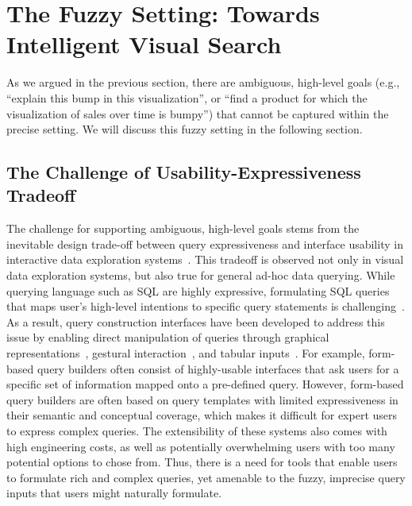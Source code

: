 \section{The Fuzzy Setting: Towards Intelligent Visual Search}\label{sec:vague}
\par As we argued in the previous section, 
there are ambiguous, high-level goals (e.g., 
``explain this bump in this visualization'', or ``find a product
for which the visualization of sales over time is bumpy'') that
cannot be captured within the precise setting. We will discuss this fuzzy setting in the following section. 


\subsection{The Challenge of Usability-Expressiveness Tradeoff}
\par The challenge for supporting ambiguous, 
high-level goals stems from the 
inevitable design trade-off between 
query expressiveness and interface 
usability in interactive data exploration 
systems~\cite{Jagadish2007,Morton2014}. 
This tradeoff is observed not only in 
visual data exploration systems, 
but also true for general ad-hoc data querying. 
While querying language such as SQL are highly expressive, 
formulating SQL queries that maps user's high-level intentions 
to specific query statements is challenging~\cite{Jagadish2007,Khoussainova2010}. 
As a result, query construction interfaces 
have been developed to address this issue by enabling 
direct manipulation of queries through 
graphical representations~\cite{Abouzied2012}, 
gestural interaction~\cite{Nandi2013}, and 
tabular inputs~\cite{Embley1989,Zloof1975}. 
For example, form-based query builders 
often consist of highly-usable interfaces 
that ask users for a specific set of information 
mapped onto a pre-defined query. 
However, form-based query builders 
are often based on query templates 
with limited expressiveness 
in their semantic and conceptual coverage, 
which makes it difficult for expert users 
to express complex queries. 
The extensibility of these systems 
also comes with high engineering costs, 
as well as potentially overwhelming users 
with too many potential options to chose from. 
Thus, there is a need for tools that enable users 
to formulate rich and complex queries, 
yet amenable to the fuzzy, imprecise query 
inputs that users might naturally formulate. 


